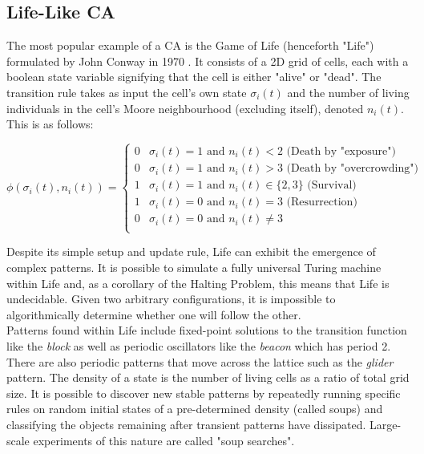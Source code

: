 \subsection{Life-Like CA} \label{sub:life}
The most popular example of a CA is the Game of Life (henceforth "Life") formulated by John Conway in 1970 \cite{gardner1970fantastic}. It consists of a 2D grid of cells, each with a boolean state variable signifying that the cell is either "alive" or "dead". The transition rule takes as input the cell's own state $\sigma_i(t)$ and the number of living individuals in the cell's Moore neighbourhood (excluding itself), denoted $n_i(t)$. This is as follows:

\begin{equation}
  \phi(\sigma_i(t), n_i(t)) = 
\begin{cases}
  0 & \sigma_i(t) = 1 \text{ and } n_i(t) < 2 \text{  (Death by "exposure")}\\
  0 & \sigma_i(t) = 1 \text{ and } n_i(t) > 3 \text{  (Death by "overcrowding")}\\
  1 & \sigma_i(t) = 1 \text{ and } n_i(t) \in \{2,3\} \text{  (Survival)}\\
  1 & \sigma_i(t) = 0 \text{ and } n_i(t) = 3 \text{  (Resurrection)}\\
  0 & \sigma_i(t) = 0 \text{ and } n_i(t) \neq 3 \\
\end{cases}
\end{equation}

Despite its simple setup and update rule, Life can exhibit the emergence of complex patterns. It is possible to simulate a fully universal Turing machine within Life\cite{rendell} and, as a corollary of the Halting Problem, this means that Life is undecidable. Given two arbitrary configurations, it is impossible to algorithmically determine whether one will follow the other.\\

Patterns found within Life include fixed-point solutions to the transition function like the \textit{block} as well as periodic oscillators like the \textit{beacon} which has period 2. There are also periodic patterns that move across the lattice such as the \textit{glider} pattern. The density of a state is the number of living cells as a ratio of total grid size. It is possible to discover new stable patterns by repeatedly running specific rules on random initial states of a pre-determined density (called soups) and classifying the objects remaining after transient patterns have dissipated. Large-scale experiments of this nature are called "soup searches"\cite{flammenkamp}.\\

